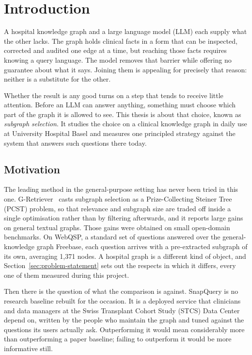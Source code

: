 \chapter{Introduction} \label{chapter:introduction}

A hospital knowledge graph and a large language model (LLM) each supply what the
other lacks. The graph holds clinical facts in a form that can be inspected,
corrected and audited one edge at a time, but reaching those facts requires
knowing a query language. The model removes that barrier while offering no
guarantee about what it says. Joining them is appealing for precisely that
reason: neither is a substitute for the other.

Whether the result is any good turns on a step that tends to receive little
attention. Before an LLM can answer anything, something must choose which part of
the graph it is allowed to see. This thesis is about that choice, known as
\emph{subgraph selection}. It studies the choice on a clinical knowledge graph in
daily use at University Hospital Basel and measures one principled strategy
against the system that answers such questions there today.

\section{Motivation} \label{sec:motivation}

The leading method in the general-purpose setting has never been tried in this
one. G-Retriever~\cite{he2024gretriever} casts subgraph selection as a
Prize-Collecting Steiner Tree (PCST) problem, so that relevance and subgraph size
are traded off inside a single optimisation rather than by filtering afterwards,
and it reports large gains on general textual graphs. Those gains were obtained
on small open-domain benchmarks. On WebQSP, a standard set of questions answered
over the general-knowledge graph Freebase, each question arrives with a
pre-extracted subgraph of its own, averaging 1{,}371 nodes. A hospital graph is a
different kind of object, and Section~\ref{sec:problem-statement} sets out the
respects in which it differs, every one of them measured during this project.

Then there is the question of what the comparison is against. SnapQuery is no
research baseline rebuilt for the occasion. It is a deployed service that
clinicians and data managers at the Swiss Transplant Cohort Study (STCS) Data
Center depend on, written by the people who maintain the graph and tuned against
the questions its users actually ask. Outperforming it would mean considerably
more than outperforming a paper baseline; failing to outperform it would be
more informative still.

